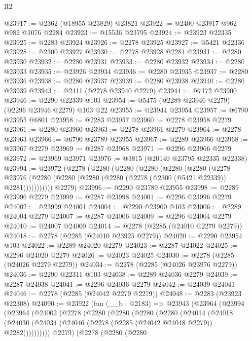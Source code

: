 \begin{lexlean}{R2}
\begin{coremodule}
@23917 := @2362 (@18955 @23829) @23821
@23922 := @2400 @23917 @962 @982 @1076 @2284
@23923 := @15536 @23795
@23924 := @23923 @22335
@23925 := @2283 @23924
@23926 := @2278 @23925
@23927 := @5421 @22336
@23928 := @2300 @23927
@23930 := @2278 @23928 @2281
@23931 := @2280 @23930
@23932 := @2280 @23931
@23933 := @2280 @23932
@23934 := @2280 @23933
@23935 := @23926 @23934
@23936 := @2280 @23935
@23937 := @2280 @23936
@23938 := @2280 @23937
@23939 := @2280 @23938
@23940 := @2280 @23939
@23943 := @2411 (@2278 @23940 @2279)
@23944 := @7172 @23900
@23946 := @2290 @22339 @103
@23954 := @5475 (@2289 @23946 @2279) (@2296 @23946 @2279) @103 @22
@23955 := @23944 @23954
@23957 := @6790 @23955 @6801
@23958 := @2283 @23957
@23960 := @2278 @23958 @2279
@23961 := @2280 @23960
@23963 := @2278 @23961 @2279
@23964 := @2278 @23963
@23966 := @6790 @23789 @23955
@23967 := @2289 @23966
@23968 := @23967 @2279
@23969 := @2287 @23968
@23971 := @2296 @23966 @2279
@23972 := @23969 @23971
@23976 := @3815 (@20140 @23795 @22335 @22338)
@23994 := @23972
    (@2278
      (@2280
        (@2280
          (@2280
            (@2280
              (@2280
                (@2278
                  @23976
                  (@2280 (@2280 (@2280 (@2280 (@2278 (@2300 (@5421 @22339)) @2281)))))))))))
      @2279)
@23996 := @2290 @23789 @23955
@23998 := @2289 @23996 @2279
@23999 := @2287 @23998
@24001 := @2296 @23996 @2279
@24002 := @23999 @24001
@24004 := @2290 @23900 @103
@24006 := @2289 @24004 @2279
@24007 := @2287 @24006
@24009 := @2296 @24004 @2279
@24010 := @24007 @24009
@24014 := @2278 (@2285 (@24010 @2279 @2279))
@24018 := @2278 (@2285 (@24010 @23925 @2279))
@24020 := @2290 @23954 @103
@24022 := @2289 @24020 @2279
@24023 := @2287 @24022
@24025 := @2296 @24020 @2279
@24026 := @24023 @24025
@24030 := @2278 (@2285 (@24026 @2279 @2279))
@24034 := @2278 (@2285 (@24026 @23976 @2279))
@24036 := @2290 @22311 @103
@24038 := @2289 @24036 @2279
@24039 := @2287 @24038
@24041 := @2296 @24036 @2279
@24042 := @24039 @24041
@24046 := @2278 (@2285 (@24042 @2279 @2279))
@24048 := @2283 (@23923 @22308)
@24090 := @23922
    (fun (__b : @2183) =>
    @23943
      (@23964
        (@23994
          (@23964
            (@24002
              (@2278
                (@2280
                  (@2280
                    (@2280
                      (@2280
                        (@24014
                          (@24018
                            (@24030
                              (@24034 (@24046 (@2278 (@2285 (@24042 @24048 @2279)) @2282))))))))))
                @2279)
              (@2278
                (@2280
                  (@2280

\end{coremodule}
\end{lexlean}
